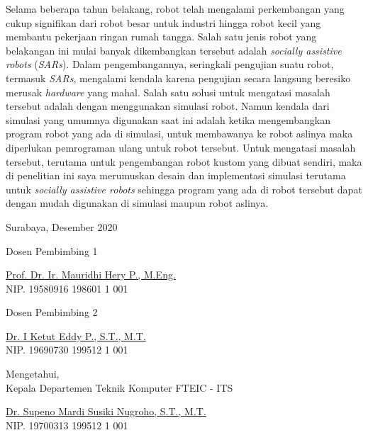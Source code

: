 Selama beberapa tahun belakang, robot telah mengalami perkembangan yang cukup signifikan dari robot besar untuk industri hingga robot kecil yang membantu pekerjaan ringan rumah tangga.
Salah satu jenis robot yang belakangan ini mulai banyak dikembangkan tersebut adalah \emph{socially assistive robots} (\emph{SARs}).
Dalam pengembangannya, seringkali pengujian suatu robot, termasuk \emph{SARs}, mengalami kendala karena pengujian secara langsung beresiko merusak \emph{hardware} yang mahal.
Salah satu solusi untuk mengatasi masalah tersebut adalah dengan menggunakan simulasi robot.
Namun kendala dari simulasi yang umumnya digunakan saat ini adalah ketika mengembangkan program robot yang ada di simulasi, untuk membawanya ke robot aslinya maka diperlukan pemrograman ulang untuk robot tersebut.
Untuk mengatasi masalah tersebut, terutama untuk pengembangan robot kustom yang dibuat sendiri, maka di penelitian ini saya merumuskan desain dan implementasi simulasi terutama untuk \emph{socially assistive robots} sehingga program yang ada di robot tersebut dapat dengan mudah digunakan di simulasi maupun robot aslinya.
\vspace{1ex}

\begin{flushright}
  Surabaya, Desember 2020
\end{flushright}
\vspace{1ex}

\begin{center}

  \begin{multicols}{2}

    Dosen Pembimbing 1
    \vspace{12ex}

    \underline{Prof. Dr. Ir. Mauridhi Hery P., M.Eng.} \\
    NIP. 19580916 198601 1 001

    \columnbreak

    Dosen Pembimbing 2
    \vspace{12ex}

    \underline{Dr. I Ketut Eddy P., S.T., M.T.} \\
    NIP. 19690730 199512 1 001

  \end{multicols}
  \vspace{6ex}

  Mengetahui, \\
  Kepala Departemen Teknik Komputer FTEIC - ITS
  \vspace{12ex}

  \underline{Dr. Supeno Mardi Susiki Nugroho, S.T., M.T.} \\
  NIP. 19700313 199512 1 001

\end{center}

